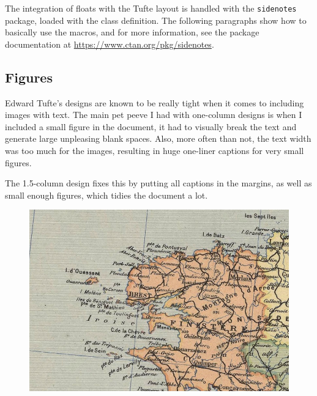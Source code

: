 The integration of floats with the Tufte layout is handled with the \texttt{sidenotes} package, loaded with the class definition. The following paragraphs show how to basically use the macros, and for more information, see the package documentation at \url{https://www.ctan.org/pkg/sidenotes}.

\subsection{Figures}

Edward Tufte's designs are known to be really tight when it comes to including images with text. The main pet peeve I had with one-column designs is when I included a small figure in the document, it had to visually break the text and generate large unpleasing blank spaces. Also, more often than not, the text width was too much for the images, resulting in huge one-liner captions for very small figures.

The 1.5-column design fixes this by putting all captions in the margins, as well as small enough figures, which tidies the document a lot.


\begin{figure}[htbp]
	\label{fig:figure-text}
	\includegraphics[width = \linewidth, outer]{figures/bretagne.png}
\end{figure}


